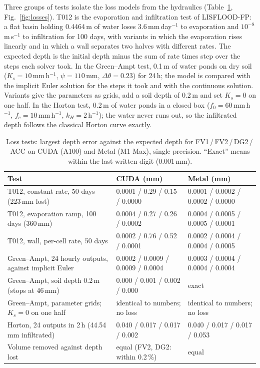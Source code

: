 \documentclass[gmd, manuscript]{copernicus}
\begin{document}
Three groups of tests isolate the loss models from the hydraulics
(Table~\ref{tab:losses}, Fig.~\ref{fig:losses}). T012 is the evaporation and
infiltration test of LISFLOOD-FP: a flat basin holding 0.4464\,m of water
loses 3.6\,mm\,day$^{-1}$ to evaporation and $10^{-8}$\,m\,s$^{-1}$ to
infiltration for 100 days, with variants in which the evaporation rises
linearly and in which a wall separates two halves with different rates. The
expected depth is the initial depth minus the sum of rate times step over
the steps each solver took. In the Green--Ampt test, 0.1\,m of water ponds
on dry soil ($K_s = 10$\,mm\,h$^{-1}$, $\psi = 110$\,mm, $\Delta\theta =
0.23$) for 24\,h; the model is compared with the implicit Euler solution for
the steps it took and with the continuous solution. Variants give the
parameters as grids, add a soil depth of 0.2\,m and set $K_s = 0$ on one
half. In the Horton test, 0.2\,m of water ponds in a closed box ($f_0 =
60$\,mm\,h$^{-1}$, $f_c = 10$\,mm\,h$^{-1}$, $k_H = 2$\,h$^{-1}$); the water
never runs out, so the infiltrated depth follows the classical Horton curve
exactly.

\begin{table}[t]
\caption{Loss tests: largest depth error against the expected depth for
FV1\,/\,FV2\,/\,DG2\,/\,ACC on CUDA (A100) and Metal (M1 Max), single
precision. ``Exact'' means within the last written digit (0.001\,mm).}
\label{tab:losses}
\centering\small
\begin{tabularx}{\textwidth}{@{}X ll@{}}
\toprule
Test & CUDA (mm) & Metal (mm) \\
\midrule
T012, constant rate, 50 days (223\,mm lost) & 0.0001 / 0.29 / 0.15 / 0.0000 & 0.0001 / 0.0002 / 0.0002 / 0.0000 \\
T012, evaporation ramp, 100 days (360\,mm) & 0.0004 / 0.27 / 0.26 / 0.0002 & 0.0004 / 0.0005 / 0.0005 / 0.0001 \\
T012, wall, per-cell rate, 50 days & 0.0002 / 0.76 / 0.52 / 0.0001 & 0.0002 / 0.0004 / 0.0004 / 0.0005 \\
Green--Ampt, 24 hourly outputs, against implicit Euler & 0.0002 / 0.0009 / 0.0009 / 0.0004 & 0.0003 / 0.0004 / 0.0004 / 0.0004 \\
Green--Ampt, soil depth 0.2\,m (stops at 46\,mm) & 0.000 / 0.001 / 0.002 / 0.000 & exact \\
Green--Ampt, parameter grids; $K_s = 0$ on one half & identical to numbers; no loss & identical to numbers; no loss \\
Horton, 24 outputs in 2\,h (44.54\,mm infiltrated) & 0.040 / 0.017 / 0.017 / 0.002 & 0.040 / 0.017 / 0.017 / 0.053 \\
Volume removed against depth lost & equal (FV2, DG2: within 0.2\,\%) & equal \\
\bottomrule
\end{tabularx}
\end{table}
\end{document}
